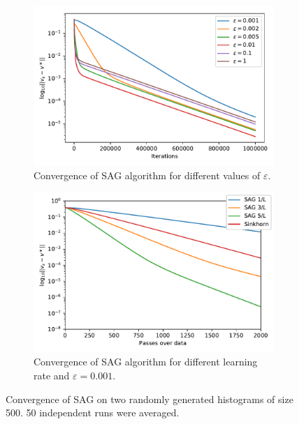 \begin{figure}[h]
    \begin{subfigure}{.49\linewidth}
        \centering
        \includegraphics[width=\linewidth]{figures/eps_bench_sag.pdf}
        \caption{Convergence of SAG algorithm for different values of $\varepsilon$.}
    \end{subfigure}
    \begin{subfigure}{.49\linewidth}
        \centering
        \includegraphics[width=\linewidth]{figures/lr_bench_sag.pdf}
        \caption{Convergence of SAG algorithm for different learning rate and $\varepsilon = 0.001$.}
    \end{subfigure}
    \caption{Convergence of SAG on two randomly generated histograms of size 500. 50 independent runs were averaged.}
\end{figure}

